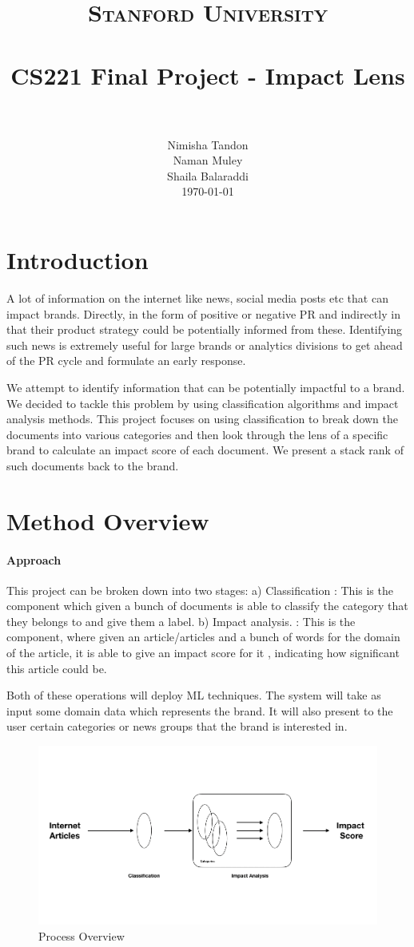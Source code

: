 \documentclass[paper=a4, fontsize=11pt]{scrartcl}
\title{
		\usefont{OT1}{bch}{b}{n}
		\normalfont \normalsize \textsc{Stanford University} \\ [25pt]
		\horrule{0.5pt} \\[0.4cm]
		\huge CS221 Final Project - Impact Lens \\
		\horrule{2pt} \\[0.5cm]
}
\author{
		\normalfont 								\normalsize
        Nimisha Tandon\\[-3pt]		\normalsize
        Naman Muley\\[-3pt]		\normalsize
        Shaila Balaraddi\\[-3pt]		\normalsize
        \today
}
\date{}
\numberwithin{equation}{section}		%
\numberwithin{figure}{section}			%
\numberwithin{table}{section}				%
\begin{document}
\maketitle
\section{Introduction}
A lot of information on the internet like news, social media posts etc that can impact brands. Directly, in the form of positive or negative PR and indirectly in that their product strategy could be potentially informed from these. Identifying such news is extremely useful for large brands or analytics divisions to get ahead of the PR cycle and formulate an early response.

\par We attempt to identify information that can be potentially impactful to a brand. We decided to tackle this problem by using classification algorithms and impact analysis methods. This project focuses on using classification to break down the documents into various categories and then look through the lens of a specific brand to calculate an impact score of each document. We present a stack rank of such documents back to the brand.

\section{Method Overview}
\paragraph{Approach}
This project can be broken down into two stages:
a) Classification : This is the component which given a bunch of documents is able to classify the category that they belongs to and give them a label.
b) Impact analysis. : This is the component, where given  an article/articles and a bunch of  words for the domain of the article, it is able to give an impact score for it , indicating how significant this article could be.

Both of these operations will deploy ML techniques. The system will take as input some domain data which represents the brand. It will also present to the user certain categories or news groups that the brand is interested in.

\begin{figure}
	\centering
 	 \includegraphics[width=0.6\linewidth]{impact_score.png}
	  \caption{Process Overview}
 	 \label{fig:Impact Potential}
\end{figure}
\end{document}
